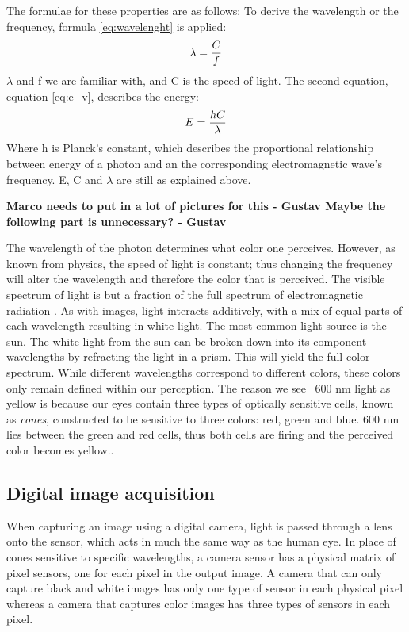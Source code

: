 The formulae for these properties are as follows:
To derive the wavelength or the frequency, formula \ref{eq:wavelenght} is applied:
\begin{align}
\centering 
\lambda = \frac{C}{f}
\label{eq:wavelenght} 
\end{align}
$\lambda$ and f we are familiar with, and C is the speed of light. The second equation, equation \ref{eq:e_v}, describes the energy:
\begin{align}
\centering
E = \frac{hC}{\lambda}
\label{eq:e_v} 
\end{align}
Where h is Planck's constant, which describes the proportional relationship between energy of a photon and an the corresponding electromagnetic wave's frequency. E, C and $\lambda$ are still as explained above.

\textbf{Marco needs to put in a lot of pictures for this - Gustav
Maybe the following part is unnecessary? - Gustav}

The wavelength of the photon determines what color one perceives. However, as known from physics, the speed of light is constant; thus changing the frequency will alter the wavelength and therefore the color that is perceived. The visible spectrum of light is but a fraction of the full spectrum of electromagnetic radiation . As with images, light interacts additively, with a mix of equal parts of each wavelength resulting in white light.
The most common light source is the sun. The white light from the sun can be broken down into its component wavelengths by refracting the light in a prism. This will yield the full color spectrum.
While different wavelengths correspond to different colors, these colors only remain defined within our perception. The reason we see ~600 nm light as yellow is because our eyes contain three types of optically sensitive cells, known as \textit{cones}, constructed to be sensitive to three colors: red, green and blue. 600 nm lies between the green and red cells, thus both cells are firing and the perceived color becomes yellow.\citep{perception_book}.

\subsection{Digital image acquisition}
When capturing an image using a digital camera, light is passed through a lens onto the sensor, which acts in much the same way as the human eye. In place of cones sensitive to specific wavelengths, a camera sensor has a physical matrix of pixel sensors, one for each pixel in the output image. A camera that can only capture black and white images has only one type of sensor in each physical pixel whereas a camera that captures color images has three types of sensors in each pixel. 


